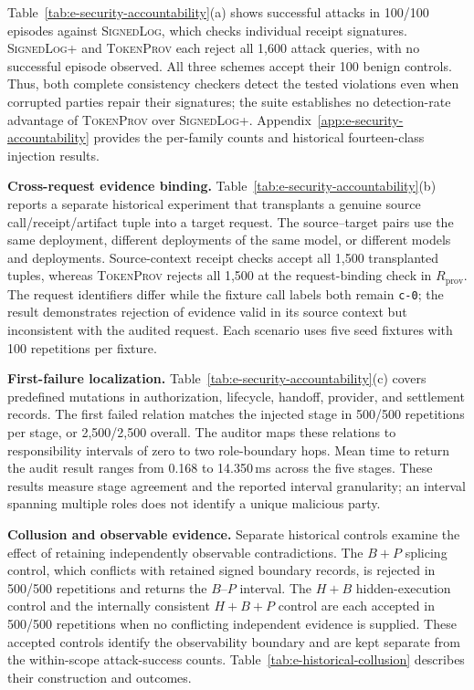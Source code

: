 Table~\ref{tab:e-security-accountability}(a) shows successful attacks in
100/100 episodes against \textsc{SignedLog}, which checks individual receipt
signatures. \textsc{SignedLog+} and \textsc{TokenProv} each reject all 1,600
attack queries, with no successful episode observed.
All three schemes accept their 100 benign controls.
Thus, both complete consistency checkers detect the tested violations even
when corrupted parties repair their signatures; the suite establishes no
detection-rate advantage of \textsc{TokenProv} over \textsc{SignedLog+}.
Appendix~\ref{app:e-security-accountability} provides the per-family counts
and historical fourteen-class injection results.

\noindent\textbf{Cross-request evidence binding.}
Table~\ref{tab:e-security-accountability}(b) reports a separate historical
experiment that transplants a genuine source call/receipt/artifact tuple into
a target request.
The source--target pairs use the same deployment, different deployments of
the same model, or different models and deployments.
Source-context receipt checks accept all 1,500 transplanted tuples, whereas
\textsc{TokenProv} rejects all 1,500 at the request-binding check in
$R_{\mathrm{prov}}$.
The request identifiers differ while the fixture call labels both remain
\texttt{c-0}; the result demonstrates rejection of evidence valid in its source
context but inconsistent with the audited request.
Each scenario uses five seed fixtures with 100 repetitions per fixture.

\noindent\textbf{First-failure localization.}
Table~\ref{tab:e-security-accountability}(c) covers predefined mutations in
authorization, lifecycle, handoff, provider, and settlement records.
The first failed relation matches the injected stage in 500/500 repetitions
per stage, or 2,500/2,500 overall.
The auditor maps these relations to responsibility intervals of zero to two
role-boundary hops.
Mean time to return the audit result ranges from 0.168 to 14.350\,ms across
the five stages.
These results measure stage agreement and the reported interval granularity;
an interval spanning multiple roles does not identify a unique malicious party.

\noindent\textbf{Collusion and observable evidence.}
Separate historical controls examine the effect of retaining independently
observable contradictions.
The $B+P$ splicing control, which conflicts with retained signed boundary
records, is rejected in 500/500 repetitions and returns the $B$--$P$ interval.
The $H+B$ hidden-execution control and the internally consistent $H+B+P$
control are each accepted in 500/500 repetitions when no conflicting
independent evidence is supplied.
These accepted controls identify the observability boundary and are kept
separate from the within-scope attack-success counts.
Table~\ref{tab:e-historical-collusion} describes their construction and outcomes.
